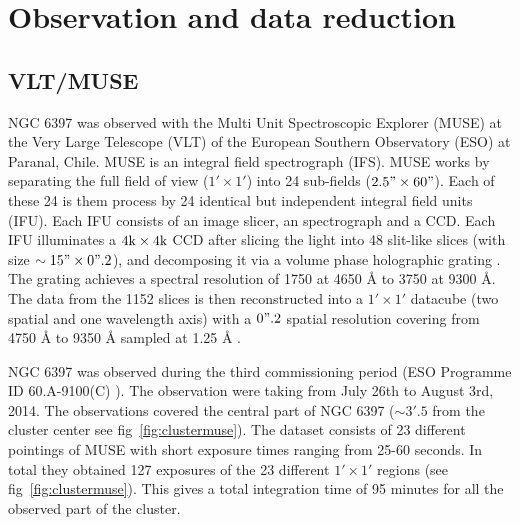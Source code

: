 \chapter{Observation and data reduction}\label{chap:data}
\thispagestyle{fancy}

\section{VLT/MUSE}

NGC 6397 was observed with the Multi Unit Spectroscopic Explorer (MUSE) at the Very Large Telescope (VLT) of the European Southern Observatory (ESO) at Paranal, Chile. MUSE is an integral field spectrograph (IFS). MUSE works by separating the full field of view ($1' \times 1'$) into 24 sub-fields ($2.5" \times 60"$). Each of these 24 is them process by 24 identical but independent integral field units (IFU). Each IFU consists of an image slicer, an spectrograph and a CCD. Each IFU illuminates a $4 \text k \times 4 \text k$ CCD after slicing the light into 48 slit-like slices (with size $\sim 15" \times 0".2$), and decomposing it via a volume phase holographic grating \citep{barden_volume-phase_1998}. The grating achieves a spectral resolution of 1750 at 4650 Å to 3750 at 9300 Å. The data from the 1152 slices is then reconstructed into a $1' \times 1'$ datacube (two spatial and one wavelength axis) with a $0".2$ spatial resolution covering from 4750 Å to 9350 Å sampled at 1.25 Å \citep{bacon_muse_2010}. 

NGC 6397 was observed during the third commissioning period  (ESO Programme ID 60.A-9100(C) \cite{bacon_muse_2014}). The observation were taking from July 26th to August 3rd, 2014. The observations covered the central part of NGC 6397 ($\sim 3'.5$ from the cluster center see fig~\ref{fig:clustermuse}). The dataset consists of 23 different pointings of MUSE with short exposure times ranging from 25-60 seconds. In total they obtained 127 exposures of the 23 different $1' \times 1'$ regions (see fig~\ref{fig:clustermuse}). This gives a total integration time of 95 minutes for all the observed part of the cluster.


